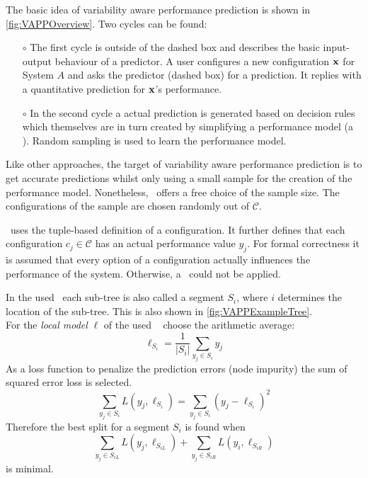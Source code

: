 The basic idea of variability aware performance prediction is shown in \cref{fig:VAPPOverview}.
Two cycles can be found:	
\FloatBarrier 
\begin{itemize}	
	\item[$\circ$] The first cycle is outside of the dashed box and describes the basic input-output behaviour of a predictor. A user configures a new configuration $\mathrm{\mathbf{x}}$ for System $A$ and asks the predictor (dashed box) for a prediction. It replies with a quantitative prediction for $\mathrm{\mathbf{x}}$'s performance.
	\item[$\circ$]  In the second cycle a actual prediction is generated based on decision rules which themselves are in turn created by simplifying a performance model (a \CART). Random sampling is used to learn the performance model.
\end{itemize}
Like other approaches, the target of variability aware performance prediction is to get accurate predictions whilst only using a small sample for the creation of the performance model. Nonetheless, \VAPP~offers a free choice of the sample size. The configurations of the sample are chosen randomly out of $\mathcal{C}$. 

\VAPP~uses the tuple-based definition of a configuration. It further defines that each configuration $c_j \in \mathcal{C}$ has an actual performance value $y_j$. For formal correctness it is assumed that every option of a configuration actually influences the performance of the system. Otherwise, a \CART~could not be applied.

In the used \CART~each sub-tree is also called a segment $S_i$, where $i$ determines the location of the sub-tree. This is also shown in \cref{fig:VAPPExampleTree}.\\
For the \textit{local model} $\ell$ of the used \CART~\citet{VariabilityAwarePerformancePredictionJianmeiSigmundApel} choose the arithmetic average:
\begin{equation}
	\ell_{S_i} = \frac{1}{|S_i|} \sum_{y_j \in S_i} y_j
\end{equation}
As a loss function to penalize the prediction errors (node impurity) the sum of squared error loss is selected.
\begin{equation}
	\sum_{y_j \in S_i} L(y_j,\ell_{S_i}) = \sum_{y_j \in S_i} (y_j - \ell_{S_i})^2
\end{equation}
Therefore the best split for a segment $S_i$ is found when
\begin{equation*}
\sum_{y_j \in S_{iL}} L(y_j,\ell_{S_{iL}}) + \sum_{y_j \in S_{iR}} L(y_i,\ell_{S_{iR}})
\end{equation*}
is minimal.

